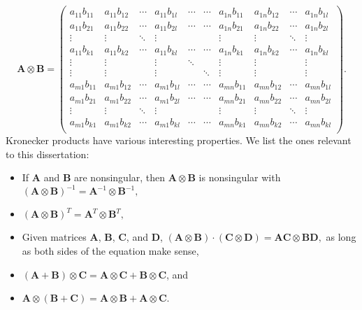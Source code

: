 \begin{equation}
	\mathbf{A} \otimes \mathbf{B} = \begin{pmatrix}
					a_{11}b_{11} & a_{11} b_{12} & \cdots & a_{11}b_{1l} & \cdots & \cdots & a_{1n}b_{11} & a_{1n} b_{12} & \cdots & a_{1n}b_{1l} \\
					a_{11}b_{21} & a_{11} b_{22} & \cdots & a_{11}b_{2l} & \cdots & \cdots & a_{1n}b_{21} & a_{1n} b_{22} & \cdots & a_{1n}b_{2l} \\
					\vdots & \vdots & \ddots & \vdots & & & \vdots & \vdots & \ddots & \vdots \\
					a_{11}b_{k1} & a_{11} b_{k2} & \cdots & a_{11}b_{kl} & \cdots & \cdots & a_{1n}b_{k1} & a_{1n} b_{k2} & \cdots & a_{1n}b_{kl} \\
					\vdots & \vdots & & \vdots & \ddots & & \vdots & \vdots & & \vdots \\
					\vdots & \vdots & & \vdots & & \ddots  & \vdots & \vdots & & \vdots \\
					a_{m1}b_{11} & a_{m1} b_{12} & \cdots & a_{m1}b_{1l} & \cdots & \cdots & a_{mn}b_{11} & a_{mn} b_{12} & \cdots & a_{mn}b_{1l} \\
					a_{m1}b_{21} & a_{m1} b_{22} & \cdots & a_{m1}b_{2l} & \cdots & \cdots & a_{mn}b_{21} & a_{mn} b_{22} & \cdots & a_{mn}b_{2l} \\
					\vdots & \vdots & \ddots & \vdots & & & \vdots & \vdots & \ddots & \vdots \\
					a_{m1}b_{k1} & a_{m1} b_{k2} & \cdots & a_{m1}b_{kl} & \cdots & \cdots & a_{mn}b_{k1} & a_{mn} b_{k2} & \cdots & a_{mn}b_{kl} \\		
			      \end{pmatrix}.
\end{equation}
Kronecker products have various interesting properties. We list the ones relevant to this dissertation:
\begin{itemize}
	\item If $\mathbf{A}$ and $\mathbf{B}$ are nonsingular, then $\mathbf{A} \otimes \mathbf{B}$ is nonsingular with $(\mathbf{A} \otimes \mathbf{B})^{-1} = \mathbf{A}^{-1} \otimes \mathbf{B}^{-1},$
	\item $(\mathbf{A} \otimes \mathbf{B})^{T} = \mathbf{A}^{T} \otimes \mathbf{B}^{T},$
	\item Given matrices $\mathbf{A}$, $\mathbf{B}$, $\mathbf{C}$, and $\mathbf{D}$, $(\mathbf{A} \otimes \mathbf{B}) \cdot (\mathbf{C} \otimes \mathbf{D}) = \mathbf{AC} \otimes \mathbf{BD},$ as long as both sides of the equation make sense,
	\item $(\mathbf{A} + \mathbf{B}) \otimes \mathbf{C} = \mathbf{A} \otimes \mathbf{C} + \mathbf{B} \otimes \mathbf{C}$, and
	\item $\mathbf{A} \otimes (\mathbf{B} + \mathbf{C}) = \mathbf{A} \otimes \mathbf{B} + \mathbf{A} \otimes \mathbf{C}.$
\end{itemize}

